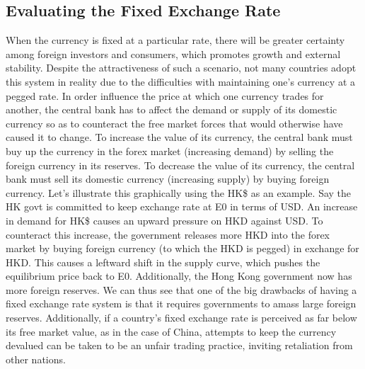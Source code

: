 \documentclass[DIV=classic,11pt,numbers=noenddot,listof=totoc,bibliography=totoc,parskip]{scrartcl}
\begin{document}
\subsection{Evaluating the Fixed Exchange Rate}
When the currency is fixed at a particular rate, there will be greater certainty among foreign investors and consumers, which promotes growth and external stability. Despite the attractiveness of such a scenario, not many countries adopt this system in reality due to the difficulties with maintaining one’s currency at a pegged rate. In order influence the price at which one currency trades for another, the central bank has to affect the demand or supply of its domestic currency so as to counteract the free market forces that would otherwise have caused it to change. To increase the value of its currency, the central bank must buy up the currency in the forex market (increasing demand) by selling the foreign currency in its reserves. To decrease the value of its currency, the central bank must sell its domestic currency (increasing supply) by buying foreign currency. Let’s illustrate this graphically using the HK\$ as an example. Say the HK govt is committed to keep exchange rate at E0 in terms of USD. An increase in demand for HK\$ causes an upward pressure on HKD against USD. To counteract this increase, the government releases more HKD into the forex market by buying foreign currency (to which the HKD is pegged) in exchange for HKD. This causes a leftward shift in the supply curve, which pushes the equilibrium price back to E0. Additionally, the Hong Kong government now has more foreign reserves. We can thus see that one of the big drawbacks of having a fixed exchange rate system is that it requires governments to amass large foreign reserves. Additionally, if a country’s fixed exchange rate is perceived as far below its free market value, as in the case of China, attempts to keep the currency devalued can be taken to be an unfair trading practice, inviting retaliation from other nations.
\end{document}
